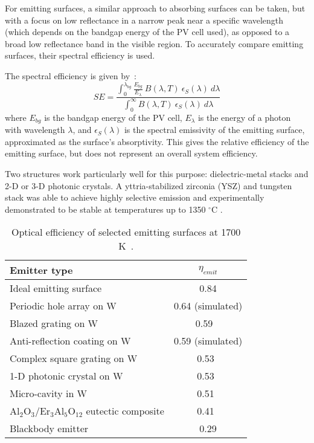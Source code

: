 \documentclass[10pt,letterpaper]{article}
\begin{document}
{For emitting surfaces, a similar approach to absorbing surfaces can be taken, but with a focus on low reflectance in a narrow peak near a specific wavelength (which depends on the bandgap energy of the PV cell used), as opposed to a broad low reflectance band in the visible region.  To accurately compare emitting surfaces, their spectral efficiency is used.

The spectral efficiency is given by~\cite{me2}:
\begin{equation}\label{SpecEff}
SE = \frac{  \int_0^{\lambda_{bg}} \frac{ E_{bg} }{E_{\lambda}} \: B(\lambda, T) \: \epsilon_S (\lambda) \: d\lambda }
{\int_0^{\infty} B(\lambda,T) \: \epsilon_S (\lambda) \: d\lambda}
\end{equation}
where $E_{bg}$ is the bandgap energy of the PV cell, $E_{\lambda}$ is the energy of a photon with wavelength $\lambda$, and $\epsilon_S (\lambda)$ is the spectral emissivity of the emitting surface, approximated as the surface's absorptivity.  This gives the relative efficiency of the emitting surface, but does not represent an overall system efficiency.

Two structures work particularly well for this purpose: dielectric-metal stacks and 2-D or 3-D photonic crystals.  A yttria-stabilized zirconia (YSZ) and tungsten stack was able to achieve highly selective emission and experimentally demonstrated to be stable at temperatures up to 1350 $^\circ$C \cite{real_efficient}.

\begin{table}
	\caption{Optical efficiency of selected emitting surfaces at 1700 K~\cite{me_thesis}.}
	\label{FOM_table}
	\begin{center}
		\begin{tabular}{|lc|}
			\hline
			Emitter type & $\eta_{emit}$\\
			\hline	
			Ideal emitting surface & 0.84 \\
			Periodic hole array on W & 0.64 (simulated)\\
			Blazed grating on W & 0.59 ~\cite{me2} \\
			Anti-reflection coating on W & 0.59 (simulated) \\
			Complex square grating on W & 0.53~\cite{paper2_ref14}\\
			1-D photonic crystal on W & 0.53~\cite{real_efficient}\\
			Micro-cavity in W & 0.51~\cite{paper2_ref6} \\
			{A}l$_2${O}$_3$/{E}r$_3${A}l$_5${O}$_{12}$ eutectic composite & 0.41~\cite{exp_tokyo}\\
			Blackbody emitter & 0.29\\
			\hline
		\end{tabular}
	\end{center}
\end{table}

}
\end{document}
